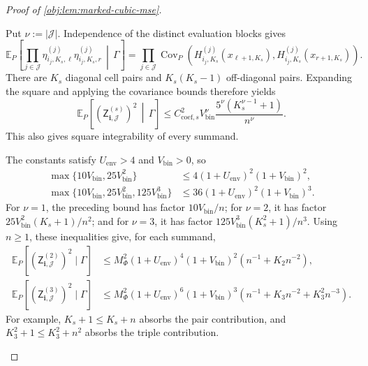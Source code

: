 \begin{proof}[Proof of \cref{obj:lem:marked-cubic-mse}]
\begin{enumerate}
Put \(\nu:=|\mathcal J|\). Independence of the distinct evaluation blocks gives
\[
\mathbb E_P\!\left[
\prod_{j\in\mathcal J}
\eta^{(j)}_{i_j,K_s,\ell}\eta^{(j)}_{i_j,K_s,r}
\,\middle|\,\Gamma
\right]
=
\prod_{j\in\mathcal J}
\operatorname{Cov}_P\!\left(
H_{i_j,K_s}^{(j)}(x_{\ell+1,K_s}),
H_{i_j,K_s}^{(j)}(x_{r+1,K_s})
\right).
\]
There are \(K_s\) diagonal cell pairs and \(K_s(K_s-1)\) off-diagonal pairs. Expanding the square and applying the covariance bounds therefore yields
\[
\mathbb E_P\!\left[
(\mathsf Z^{(s)}_{\boldsymbol i,\mathcal J})^2
\,\middle|\,\Gamma
\right]
\le
C_{\mathrm{coef},s}^2V_{\mathrm{bin}}^\nu
\frac{5^\nu(K_s^{\nu-1}+1)}{n^\nu}.
\]
This also gives square integrability of every summand.

The constants satisfy \(U_{\mathrm{env}}>4\) and \(V_{\mathrm{bin}}>0\), so
\[
\begin{aligned}
\max\{10V_{\mathrm{bin}},25V_{\mathrm{bin}}^2\}
&\le4(1+U_{\mathrm{env}})^2(1+V_{\mathrm{bin}})^2,\\
\max\{10V_{\mathrm{bin}},25V_{\mathrm{bin}}^2,
125V_{\mathrm{bin}}^3\}
&\le36(1+U_{\mathrm{env}})^2(1+V_{\mathrm{bin}})^3.
\end{aligned}
\]
For \(\nu=1\), the preceding bound has factor \(10V_{\mathrm{bin}}/n\); for \(\nu=2\), it has factor \(25V_{\mathrm{bin}}^2(K_s+1)/n^2\); and for \(\nu=3\), it has factor \(125V_{\mathrm{bin}}^3(K_s^2+1)/n^3\).
Using \(n\ge1\), these inequalities give, for each summand,
\[
\begin{aligned}
\mathbb E_P[(\mathsf Z^{(2)}_{\boldsymbol i,\mathcal J})^2\mid\Gamma]
&\le
M_\Phi^2(1+U_{\mathrm{env}})^4(1+V_{\mathrm{bin}})^2
(n^{-1}+K_2n^{-2}),\\
\mathbb E_P[(\mathsf Z^{(3)}_{\boldsymbol i,\mathcal J})^2\mid\Gamma]
&\le
M_\Phi^2(1+U_{\mathrm{env}})^6(1+V_{\mathrm{bin}})^3
(n^{-1}+K_3n^{-2}+K_3^2n^{-3}).
\end{aligned}
\]
For example, \(K_s+1\le K_s+n\) absorbs the pair contribution, and \(K_3^2+1\le K_3^2+n^2\) absorbs the triple contribution.


\end{enumerate}
\end{proof}
